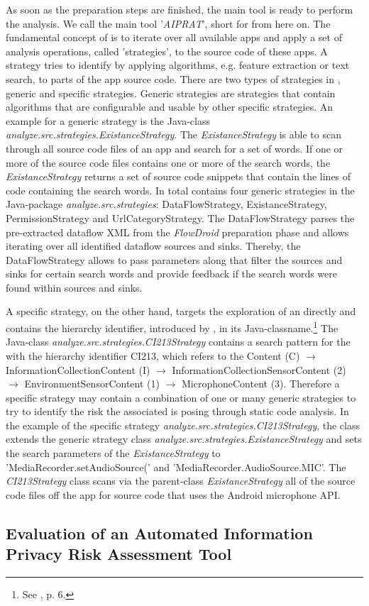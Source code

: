 As soon as the preparation steps are finished, the main \sca tool is ready to perform the \ipr analysis.
We call the main \sca tool '\textit{AIPRAT}', short for \aiprat from here on.
The fundamental concept of \AIPRAT is to iterate over all available apps and apply a set of analysis operations, called 'strategies', to the source code of these apps.
A strategy tries to identify \iprfs by applying algorithms, e.g. feature extraction or text search, to parts of the app source code.
There are two types of strategies in \AIPRAT, generic and specific strategies.
Generic strategies are strategies that contain algorithms that are configurable and usable by other specific strategies.
An example for a generic strategy is the Java-class \textit{analyze.src.strategies.ExistanceStrategy}. 
The \textit{ExistanceStrategy} is able to scan through all source code files of an app and search for a set of words.
If one or more of the source code files contains one or more of the search words, the \textit{ExistanceStrategy} returns a set of source code snippets that contain the lines of code containing the search words.
In total \AIPRAT contains four generic strategies in the Java-package \textit{analyze.src.strategies}: DataFlowStrategy, ExistanceStrategy, PermissionStrategy and UrlCategoryStrategy.
The DataFlowStrategy parses the pre-extracted dataflow \acs{XML} from the \textit{FlowDroid} preparation phase and allows iterating over all identified dataflow sources and sinks.
Thereby, the DataFlowStrategy allows to pass parameters along that filter the sources and sinks for certain search words and provide feedback if the search words were found within sources and sinks.

A specific strategy, on the other hand, targets the exploration of an \ipp directly and contains the \ipp hierarchy identifier, introduced by \textcite{Dehling2016}, in its Java-classname.\footnote{See \cite{Dehling2016}, p. 6.}
The Java-class \textit{analyze.src.strategies.CI213\textunderscore Strategy} contains a search pattern for the \ipp with the hierarchy identifier CI213, which refers to the \ipp Content (C) $\rightarrow$ InformationCollectionContent (I) $\rightarrow$ InformationCollectionSensorContent (2) $\rightarrow$ EnvironmentSensorContent (1) $\rightarrow$ MicrophoneContent (3).
Therefore a specific strategy may contain a combination of one or many generic strategies to try to identify the risk the associated \ipp is posing through static code analysis.
In the example of the specific strategy \textit{analyze.src.strategies.CI213\textunderscore Strategy}, the class extends the generic strategy class \textit{analyze.src.strategies.ExistanceStrategy} and sets the search parameters of the \textit{ExistanceStrategy} to 'MediaRecorder.setAudioSource(' and 'MediaRecorder.AudioSource.MIC'.
The \textit{CI213\textunderscore Strategy} class scans via the parent-class \textit{ExistanceStrategy} all of the source code files off the app for source code that uses the Android microphone \acs{API}.


\subsection{Evaluation of an Automated Information Privacy Risk Assessment Tool}